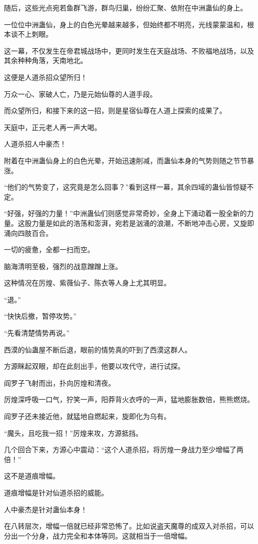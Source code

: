 \begin{this_body}
随后，这些光点宛若鱼群飞游，群鸟归巢，纷纷汇聚、依附在中洲蛊仙的身上。

一位位中洲蛊仙，身上的白色光晕越来越多，但始终都不明亮，光线蒙蒙温和，根本谈不上刺眼。

这一幕，不仅发生在帝君城战场中，更同时发生在天庭战场、不败福地战场，以及其余种种角落，天南地北。

这便是人道杀招众望所归！

万众一心、家破人亡，乃是元始仙尊的人道手段。

而众望所归，和接下来的这一招，则是星宿仙尊在人道上探索的成果了。

天庭中，正元老人再一声大喝。

人道杀招人中豪杰！

附着在中洲蛊仙身上的白色光晕，开始迅速削减，而蛊仙本身的气势则随之节节暴涨。

“他们的气势变了，这究竟是怎么回事？”看到这样一幕，其余四域的蛊仙皆惊疑不定。

“好强，好强的力量！”中洲蛊仙们则感觉非常奇妙，全身上下涌动着一股全新的力量。这股力量是如此的浩荡和澎湃，宛若是汹涌的浪潮，不断地冲击心房，又旋即涌向四肢百合。

一切的疲惫，全都一扫而空。

脑海清明至极，强烈的战意蹭蹭上涨。

这种情况在厉煌、紫薇仙子、陈衣等人身上尤其明显。

“退。”

“快快后撤，暂停攻势。”

“先看清楚情势再说。”

西漠的仙蛊屋不断后退，眼前的情势真的吓到了西漠这群人。

方源眯起双眼，却在此刻出手，他要以攻代守，进行试探。

阎罗子飞射而出，扑向厉煌和清夜。

厉煌深呼吸一口气，狞笑一声，阳莽背火衣呼的一声，猛地膨胀数倍，熊熊燃烧。

阎罗子还未接近他，就猛地自燃起来，旋即化为乌有。

“魔头，且吃我一招！”厉煌来攻，方源抵挡。

几个回合下来，方源心中震动：“这个人道杀招，将厉煌一身战力至少增幅了两倍！”

这不是道痕增幅。

道痕增幅是针对仙道杀招的威能。

人中豪杰是针对蛊仙本身！

在八转层次，增幅一倍就已经非常恐怖了。比如说盗天魔尊的成双入对杀招，可以分出一个分身，战力完全和本体等同。这就相当于一倍增幅。


\end{this_body}

